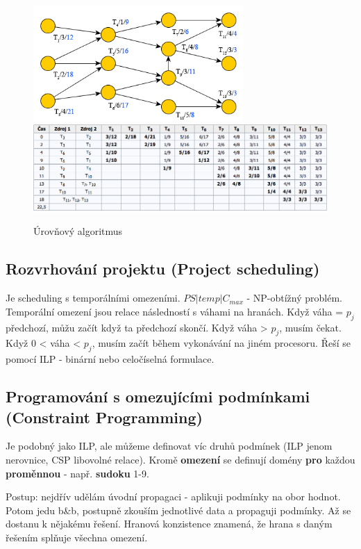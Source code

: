 \begin{figure}[h]
    \begin{center}
        \includegraphics[width=80mm]{spolecne/10/images/level-alg}
        \includegraphics[width=130mm]{spolecne/10/images/level-alg-tab}
    \end{center}
    \vspace{-5px}
    \caption{Úrovňový algoritmus}
    \vspace{-5px}
\end{figure}


\subsection{Rozvrhování projektu (Project scheduling)}
Je scheduling s temporálními omezeními. $PS|temp|C_{max}$ - NP-obtížný problém. Temporální omezení jsou relace následností s váhami na hranách. Když váha = $p_j$ předchozí, můžu začít když ta předchozí skončí. Když váha > $p_j$, musím čekat. Když 0 < váha < $p_j$, musím začít během vykonávání na jiném procesoru. Řeší se pomocí ILP - binární nebo celočíselná formulace.

\subsection{Programování s omezujícími podmínkami (Constraint Programming)}
Je podobný jako ILP, ale můžeme definovat víc druhů podmínek (ILP jenom nerovnice, CSP libovolné relace). Kromě \textbf{omezení} se definují domény \textbf{pro} každou \textbf{proměnnou} - např. \textbf{sudoku} 1-9.

Postup: nejdřív udělám úvodní propagaci - aplikuji podmínky na obor hodnot. Potom jedu b\&b, postupně zkouším jednotlivé data a propaguji podmínky. Až se dostanu k nějakému řešení. Hranová konzistence znamená, že hrana s daným řešením splňuje všechna omezení.

